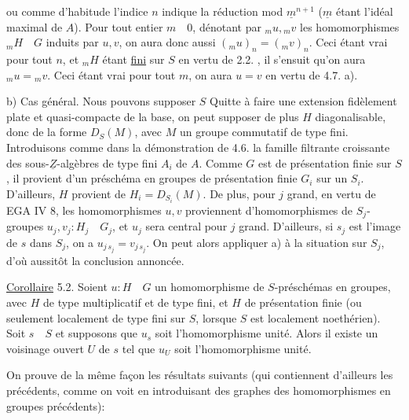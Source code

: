 ou comme d'habitude l'indice $n$ indique la réduction mod 
$\underline{m}^{n+1}$ ($\underline{m}$ étant l'idéal maximal de $A$). Pour tout entier $m\quad0$, dénotant
par ${}_m u,{}_m v$ les homomorphismes ${}_m H\quad G$ induits par $u,v$, on aura donc
aussi $({}_m u)_n=({}_m v)_n$. Ceci étant vrai pour tout $n$, et ${}_m H$ étant \uline{fini}
sur $S$ en vertu de 2.2. , il s'ensuit qu'on aura ${}_m u={}_m v$. Ceci étant
vrai pour tout $m$, on aura $u=v$ en vertu de 4.7. a).

b) Cas général. Nous  pouvons supposer $S$   Quitte à faire une extension fidèlement plate et quasi-compacte de la base, on peut supposer de plus $H$ diagonalisable, donc
de la forme $D_S(M)$, avec $M$ un groupe commutatif de type fini. Introduisons comme dans la démonstration de 4.6. la famille filtrante croissante des sous-$\underline{Z}$-algèbres  de type fini $A_i$ de $A$. Comme $G$ est de présentation finie sur $S$, il provient d'un  préschéma en groupes de
présentation finie $G_i$ sur un $S_i$. D'ailleurs, $H$ provient de $H_i=D_{S_i}(M)$.
De plus, pour $j$ grand, en vertu de EGA IV 8, les homomorphismes
 $u,v$ proviennent d'homomorphismes de $S_j$-groupes $u_j,v_j:H_j\quad G_j$,
 et $u_j$ sera central pour $j$ grand. D'ailleurs, si $s_j$ est
l'image de $s$ dans $S_j$, on a $u_{j\,s_j}=v_{j\,s_j}$. On peut alors appliquer a)
à la situation sur $S_j$, d'où aussitôt la conclusion annoncée.

\uline{Corollaire} 5.2. Soient $u:H\quad G$ un homomorphisme de $S$-préschémas en
groupes, avec $H$ de type multiplicatif et de type fini, et $H$ de présentation finie (ou seulement localement de  type fini sur $S$, lorsque
$S$ est localement noethérien). Soit $s\quad S$ et supposons que $u_s$ soit l'homomorphisme unité. Alors il existe un voisinage ouvert $U$ de $s$ tel que
$u_U$ soit l'homomorphisme unité.

On prouve de la même façon les résultats suivants (qui contiennent
d'ailleurs les précédents, comme on voit en introduisant des 
graphes des homomorphismes en groupes précédents):


